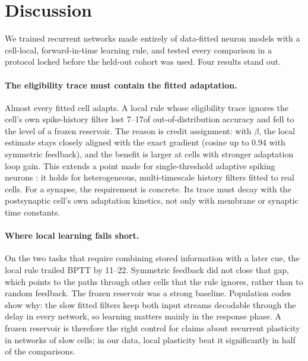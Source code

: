 \section{Discussion}

We trained recurrent networks made entirely of data-fitted neuron models with a cell-local,
forward-in-time learning rule, and tested every comparison in a protocol locked before the
held-out cohort was used. Four results stand out.

\paragraph{The eligibility trace must contain the fitted adaptation.}
Almost every fitted cell adapts. A local rule whose eligibility trace ignores the cell's own
spike-history filter lost 7--17\pp of out-of-distribution accuracy and fell to the level of a
frozen reservoir. The reason is credit assignment: with $\beta$, the local estimate stays
closely aligned with the exact gradient (cosine up to 0.94 with symmetric feedback), and the
benefit is larger at cells with stronger adaptation loop gain. This extends a point made for
single-threshold adaptive spiking neurons
\citep{bellec2020eprop,bellec2018lsnn,salaj2021sfa}: it holds for heterogeneous, multi-timescale
history filters fitted to real cells. For a synapse, the requirement is concrete. Its trace
must decay with the postsynaptic cell's own adaptation kinetics, not only with membrane or
synaptic time constants.

\paragraph{Where local learning falls short.}
On the two tasks that require combining stored information with a later cue, the local rule
trailed BPTT by 11--22\pp. Symmetric feedback did not close that gap, which points to the paths
through other cells that the rule ignores, rather than to random feedback. The frozen reservoir
was a strong baseline. Population codes show why: the slow fitted filters keep both input
streams decodable through the delay in every network, so learning matters mainly in the response
phase. A frozen reservoir is therefore the right control for claims about recurrent plasticity in
networks of slow cells; in our data, local plasticity beat it significantly in half of the
comparisons.

